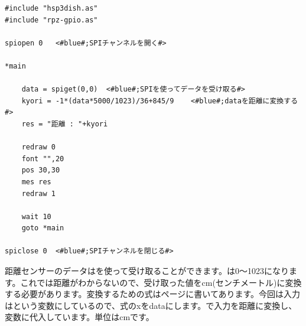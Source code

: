 \begin{lstlisting}[caption=kyori.hsp,label=kyori.hsp]
#include "hsp3dish.as"
#include "rpz-gpio.as"

spiopen 0	<#blue#;SPIチャンネルを開く#>

*main

	data = spiget(0,0)	<#blue#;SPIを使ってデータを受け取る#>
	kyori = -1*(data*5000/1023)/36+845/9	<#blue#;dataを距離に変換する#>
	res = "距離 : "+kyori
	
	redraw 0
	font "",20
	pos 30,30
	mes res
	redraw 1

	wait 10
	goto *main

spiclose 0	<#blue#;SPIチャンネルを閉じる#>
\end{lstlisting}

距離センサーのデータはを使って受け取ることができます。は0～1023になります。これでは距離がわからないので、受け取った値をcm(センチメートル)に変換する必要があります。変換するための式は\pageref{distance}ページに書いてあります。今回は入力はという変数にしているので、式のxをdataにします。で入力を距離に変換し、変数に代入しています。単位はcmです。\\

\begin{tcolorbox}[title=\useOmetoi]
\begin{enumerate}
\end{enumerate}
\end{tcolorbox}
